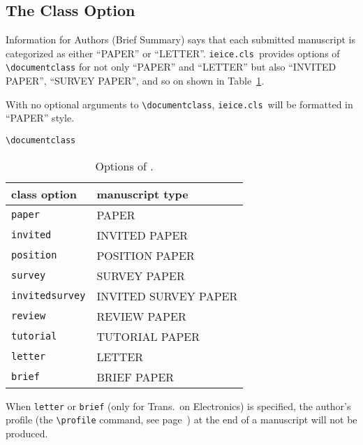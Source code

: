 \documentclass[paper]{ieice}
\def\ClassFile{\texttt{ieice.cls}}
\begin{document}
\subsection{The Class Option}

Information for Authors (Brief Summary) says that 
each submitted manuscript is categorized as either ``PAPER'' or ``LETTER''. 
\ClassFile\ provides options of \verb/\documentclass/ 
for not only ``PAPER'' and ``LETTER'' 
but also ``INVITED PAPER'', ``SURVEY PAPER'', 
and so on shown in Table~\ref{classoption}. 

With no optional arguments to \verb/\documentclass/, 
\ClassFile\ will be formatted in ``PAPER'' style. 

\begin{table}[tb]%
\hbox{\verb/\documentclass/}%
\caption{Options of .}
\label{classoption}
\begin{center}
\begin{tabular}{ll}
\hline
\textbf{class option}  & \textbf{manuscript type}\\
\hline
\texttt{paper}         & \textsf{PAPER}\\
\texttt{invited}       & \textsf{INVITED PAPER}\\
\texttt{position}      & \textsf{POSITION PAPER}\\
\texttt{survey}        & \textsf{SURVEY PAPER}\\
\texttt{invitedsurvey} & \textsf{INVITED SURVEY PAPER}\\
\texttt{review}        & \textsf{REVIEW PAPER}\\
\texttt{tutorial}      & \textsf{TUTORIAL PAPER}\\
\hline
\texttt{letter}        & \textsf{LETTER}\\
\texttt{brief}         & \textsf{BRIEF PAPER}\\
\hline
\end{tabular}%
\end{center}
\end{table}


When \texttt{letter} or \texttt{brief} (only for Trans.\ on Electronics) 
is specified, the author's profile 
(the \verb/\profile/ command, see page~\pageref{profile:command}) 
at the end of a manuscript will not be produced. 
\end{document}
